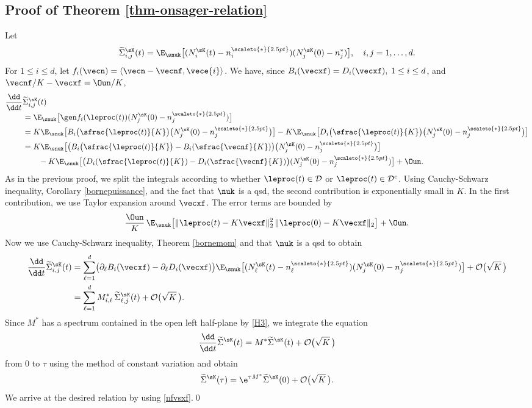 \subsection{Proof of Theorem \ref{thm-onsager-relation}}\label{proof:onsager}

Let
\[
\widetilde{\Sigma}_{i,j}^{\sK}(t)=\E_{\snuk}\bigl[(N_{i}^{\sK}(t)-n_{i}^{\scaleto{*}{2.5pt}})(N_{j}^{\sK}(0)-n_{j}^*)\bigr],\quad i,j=1,\ldots,d.
\]
For $1\leq i\leq d$, let $f_i(\vecn)=\langle \vecn-\vecnf,\vece{i}\rangle$.
We have, since $B_{i}(\vecxf)=D_{i}(\vecxf),\; 1\le i\le d$, and $\vecnf/K-\vecxf=\Oun/K$,\vspace*{-3pt}
\begin{align*}
\frac{\dd}{\dd t}&\widetilde{\Sigma}_{i,j}^{\sK}(t)\\[-3pt]
& =\E_{\snuk}\bigl[\gen f_i(\leproc(t)) (N_{j}^{\sK}(0)-n_{j}^{\scaleto{*}{2.5pt}})\bigr]\\
& =K\E_{\snuk}\bigl[B_{i}\bigl(\sfrac{\leproc(t)}{K}\bigr)\bigl(N_{j}^{\sK}(0)-n_{j}^{\scaleto{*}{2.5pt}}\bigr)\bigr]-K\E_{\snuk}\bigl[D_{i}\bigl(\sfrac{\leproc(t)}{K}\bigr)\bigl(N_{j}^{\sK}
(0)-n_{j}^{\scaleto{*}{2.5pt}}\bigr) \bigr]\\
&=K\E_{\snuk}\bigl[\bigl(B_{i} \bigl(\sfrac{\leproc(t)}{K} \bigr)-B_{i}(\sfrac{\vecnf}{K}) \bigr)
\bigl(N_{j}^{\sK}(0)-n_{j}^{\scaleto{*}{2.5pt}}\bigr) \bigr]\\
& \qquad -K\E_{\snuk}\bigl[\bigl(D_{i}(\sfrac{\leproc(t)}{K})
-D_{i}(\sfrac{\vecnf}{K}) \bigr)(N_{j}^{\sK}(0)-n_{j}^{\scaleto{*}{2.5pt}}) \bigr] + \Oun.
\end{align*}
As in the previous proof, we split the integrals according to whether $\leproc(t)\in \mathcal{D}$ or
$\leproc(t)\in \mathcal{D}^c$. Using Cauchy-Schwarz inequality, Corollary \ref{bornepuissance}, and the fact that $\nuk$ is a qsd, the second contribution is exponentially small in $K$. In the first contribution, we use Taylor expansion around $\vecxf$.
The error terms are bounded by
\[
\frac{\Oun}{K}\, \E_{\snuk}\bigl[\|\leproc(t)-K\vecxf\|_{2}^2\,\|\leproc(0)-K\vecxf\|_{2}\bigr]
+\Oun.
\]
Now we use Cauchy-Schwarz inequality, Theorem \ref{bornemom} and that $\nuk$ is a qsd to obtain
\begin{align*}
\frac{\dd}{\dd t}\widetilde{\Sigma}_{i,j}^{\sK}(t)&=\sum_{\ell=1}^{d}\bigl(\partial_{\ell}B_{i}(\vecxf)-\partial_{\ell}D_{i}(\vecxf)\bigr)
\E_{\snuk}\bigl[(N_{\ell}^{\sK}(t)-n_{\ell}^{\scaleto{*}{2.5pt}}) (N_{j}^{\sK}(0)-n_{j}^{\scaleto{*}{2.5pt}})\bigr]+
\mathcal{O} \bigl(\sqrt K\, \bigr)\\
& =\sum_{\ell=1}^{d}M_{i,\ell}^{*}\, \widetilde{\Sigma}^{\sK}_{\ell,j}(t)+\mathcal{O}\bigl(\sqrt K\,\bigr).
\end{align*}
Since $M^*$ has a spectrum contained in the open left half-plane by \eqref{H3}, we integrate the equation
\[
\frac{\dd}{\dd t}\widetilde{\Sigma}^{\sK}(t)= M^*\widetilde{\Sigma}^{\sK}(t)+\mathcal{O}\bigl(\sqrt K\,\bigr)
\]
from $0$ to $\tau$ using the method of constant variation and obtain
\begin{equation*}
\widetilde{\Sigma}^{\sK}(\tau)=\e^{\tau M^*}\widetilde{\Sigma}^{\sK}(0)+\mathcal{O}\bigl(\sqrt K\,\bigr).
\end{equation*}
We arrive at the desired relation by using \eqref{nfvsxf}.\qed

